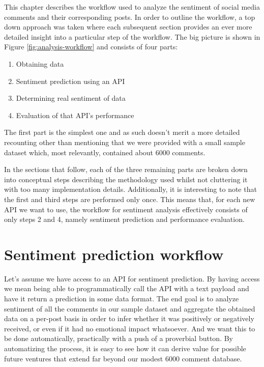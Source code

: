 This chapter describes the workflow used to analyze the sentiment of social media comments and their corresponding posts.
In order to outline the workflow, a top down approach was taken where each subsequent section provides an ever more detailed insight into a particular step of the workflow.
The big picture is shown in Figure \ref{fig:analysis-workflow} and consists of four parts:
\begin{enumerate}
  \item Obtaining data
  \item Sentiment prediction using an API
  \item Determining real sentiment of data
  \item Evaluation of that API's performance
\end{enumerate}

The first part is the simplest one and as such doesn't merit a more detailed recounting other than mentioning that we were provided with a small sample dataset which, most relevantly, contained about 6000 comments.

In the sections that follow, each of the three remaining parts are broken down into conceptual steps describing the methodology used whilst not cluttering it with too many implementation details.
Additionally, it is interesting to note that the first and third steps are performed only once.
This means that, for each new API we want to use, the workflow for sentiment analysis effectively consists of only steps 2 and 4, namely sentiment prediction and performance evaluation.





\section{Sentiment prediction workflow\label{sec:sentiment-prediction-workflow}}
Let's assume we have access to an API for sentiment prediction. By having access we mean being able to programmatically call the API with a text payload and have it return a prediction in some data format. The end goal is to analyze sentiment of all the comments in our sample dataset and aggregate the obtained data on a per-post basis in order to infer whether it was positively or negatively received, or even if it had no emotional impact whatsoever. And we want this to be done automatically, practically with a push of a proverbial button. By automatizing the process, it is easy to see how it can derive value for possible future ventures that extend far beyond our modest 6000 comment database.

